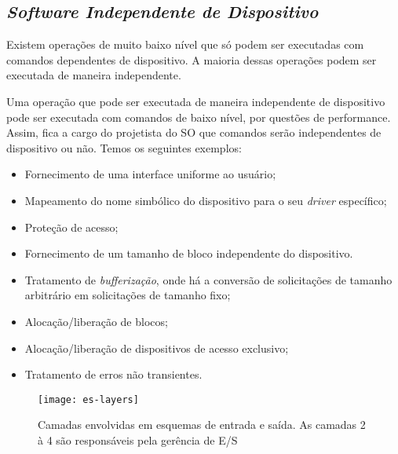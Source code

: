 \subsection{\textit{Software Independente de Dispositivo}}
Existem operações de muito baixo nível que só podem ser executadas com comandos dependentes de dispositivo. A maioria dessas operações podem ser executada de maneira independente.

Uma operação que pode ser executada de maneira independente de dispositivo pode ser executada com comandos de baixo nível, por questões de performance. Assim, fica a cargo do projetista do SO que comandos serão independentes de dispositivo ou não. Temos os seguintes exemplos:
\begin{itemize}
  \item Fornecimento de uma interface uniforme ao usuário;

  \item Mapeamento do nome simbólico do dispositivo para o seu \textit{driver} específico;

  \item Proteção de acesso;

  \item Fornecimento de um tamanho de bloco independente do dispositivo.

  \item Tratamento de \textit{bufferização}, onde há a conversão de solicitações de tamanho arbitrário em solicitações de tamanho fixo;

  \item Alocação/liberação de blocos;

  \item Alocação/liberação de dispositivos de acesso exclusivo;

  \item Tratamento de erros não transientes.
\end{itemize}

\begin{figure}[h]
  \centering
  \texttt{[image: es-layers]}
  \caption{Camadas envolvidas em esquemas de entrada e saída. As camadas 2 à 4 são responsáveis pela gerência de E/S}
  \label{fig:es-layers}
\end{figure}
